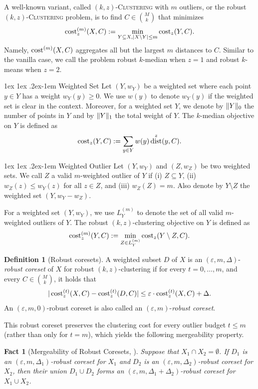 \documentclass[11pt,letterpaper]{article}
\makeatletter
\renewcommand{\paragraph}{%
  \@startsection{paragraph}{4}%
  {\z@}{1ex \@plus 1ex \@minus .2ex}{-1em}%
  {\normalfont\normalsize\bfseries}%
}
\newtheorem{fact}[theorem]{Fact}
\theoremstyle{definition}
\newtheorem{definition}[theorem]{Definition}
\newcommand{\eps}{\varepsilon}
\newcommand{\ProblemName}[1]{\textsc{#1}}
\newcommand{\kzC}{\ProblemName{$(k, z)$-Clustering}\xspace}
\DeclareMathOperator{\dist}{dist}
\DeclarePairedDelimiter{\norm}{\lVert}{\rVert}
\makeatother
\begin{document}
A well-known variant, called \kzC with $m$ outliers, or the robust\kzC problem, is to find $C\in \binom{M}{k}$ that minimizes
\[
\cost^{(m)}_z(X,C):=\min_{Y\subseteq X,|X\setminus Y|\leq m} \cost_z(Y,C).
\] 
Namely, $\cost^{(m)}(X,C)$ aggregates all but the largest $m$ distances to $C$.
%
Similar to the vanilla case, we call the problem robust $k$-median when $z = 1$ and robust $k$-means when $z=2$.

\paragraph{Weighted Set} Let $(Y,w_Y)$ be a weighted set where each point $y\in Y$ has a weight $w_Y(y)\geq 0$. We use $w(y)$ to denote $w_Y(y)$ if the weighted set is clear in the context. Moreover, for a weighted set $Y$, we denote by $\norm{Y}_0$ the number of points in $Y$ and by $\norm{Y}_1$ the total weight of $Y$.
The $k$-median objective on $Y$ is defined as $$
\cost_z(Y,C):=\sum_{y\in Y} w(y)\dist^z(y,C).
$$

\paragraph{Weighted Outlier} Let $(Y, w_Y)$ and $(Z, w_Z)$ be two weighted sets. We call $Z$  a valid $m$-weighted outlier of $Y$ if (i) $Z\subseteq Y$, (ii) $w_Z(z)\leq w_Y(z)$ for all $z\in Z$, and (iii) $w_Z(Z) = m$. Also denote by $Y\setminus Z$ the weighted set $(Y, w_Y-w_Z)$.

For a weighted set $(Y, w_Y)$, we use $L_Y^{(m)}$ to denote the set of all valid $m$-weighted outliers of $Y$. 
%
The robust $(k,z)$-clustering objective on $Y$ is defined as 
$$
\cost^{(m)}_z(Y,C):=\min_{Z\in L_Y^{(m)}} \cost_z(Y\setminus Z,C).
$$

\begin{definition}[Robust coresets] \label{def:rbcoreset}
	A weighted subset $D$ of $X$ is an $(\eps,m,\Delta)$-\emph{robust coreset} of $X$ for robust $(k,z)$-clustering if for every $t=0,\dots,m$, and every $C\in \binom{M}{k}$, it holds that
	$$
	|\cost[t]_z(X,C)-\cost[t]_z(D,C)|\leq \eps\cdot\cost[t]_z(X,C)+ \Delta.
	$$
	An $(\eps,m,0)$-robust coreset is also called an $(\eps,m)$-\emph{robust coreset}.
\end{definition}

This robust coreset preserves the clustering cost for every outlier budget $t\le m$ (rather than only for $t=m$), which yields the following mergeability property.
%

\begin{fact}[Mergeability of Robust Coresets, \cite{huang2022near}]\label{fact_merge}
	Suppose that $X_1\cap X_2=\emptyset$. If $D_1$ is an $(\eps,m,\Delta_1)$-robust coreset for $X_1$ and $D_2$ is an $(\eps,m,\Delta_2)$-robust coreset for $X_2$, then their union $D_1\cup D_2$ forms an $(\eps,m,\Delta_1+\Delta_2)$-robust coreset for $X_1\cup X_2$.
\end{fact}
\end{document}
